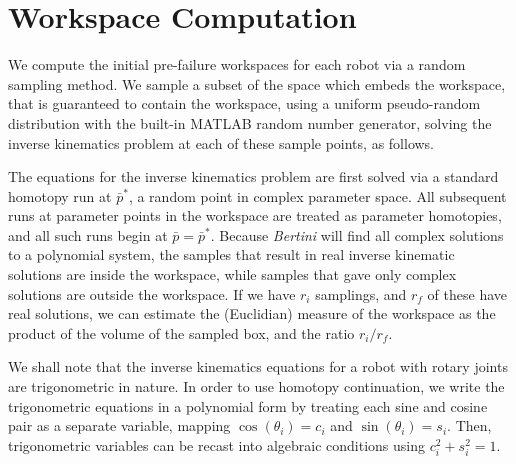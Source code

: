 \documentclass[12pt]{report}
\begin{document}
\section{Workspace Computation} \label{sec:workspacecomputation}



We compute the initial pre-failure workspaces for each robot via a random sampling method. We sample a subset of  the space which embeds the workspace, that is guaranteed to contain the workspace, using a uniform pseudo-random distribution with the built-in MATLAB random number generator, solving the inverse kinematics problem at each of these sample points, as follows.

The equations for the inverse kinematics problem are first solved via a standard homotopy run at 
$\bar{p}^*$, a random point in complex parameter space. All subsequent runs at parameter points in the workspace are treated as parameter homotopies, and all such runs begin at $\bar{p}=\bar{p}^*$. 
Because \emph{Bertini} will find all complex solutions to a polynomial system, the samples that result in real inverse kinematic solutions are inside the workspace, while samples that gave only complex solutions are outside the workspace.  If we have $r_i$ samplings, and $r_f$ of these have real solutions, we can estimate the (Euclidian) measure of the workspace as the product of the volume of the sampled box, and the ratio $r_i/r_f$.  


We shall note that the inverse kinematics equations for a robot with rotary joints are trigonometric in nature.   In order to use homotopy continuation, we  write the trigonometric equations in a polynomial form by treating each sine and cosine pair as a separate variable, mapping $\cos(\theta_i) = c_i$ and $\sin(\theta_i) = s_i$.  Then, trigonometric variables can be recast into algebraic conditions using $c_i^2+s_i^2=1$. 


\end{document}

